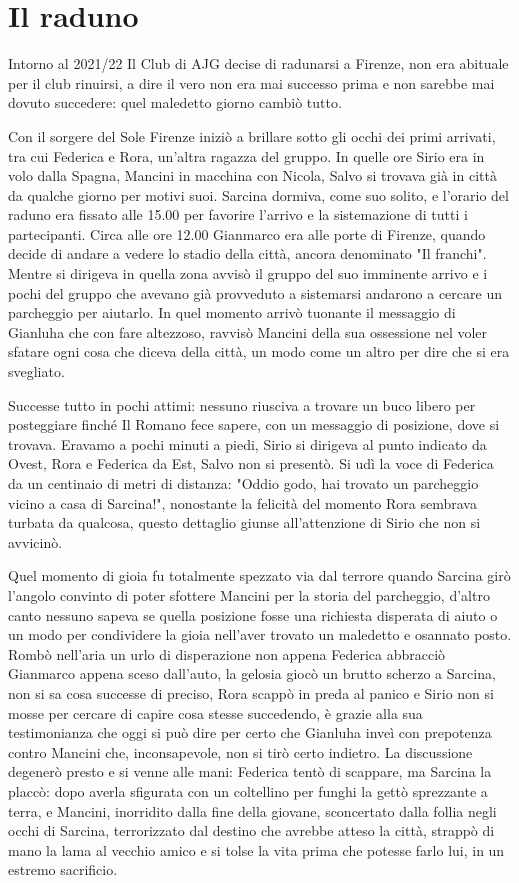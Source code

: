 \section{Il raduno}
Intorno al 2021/22 Il Club di AJG decise di radunarsi a Firenze, non era abituale per il club rinuirsi, a dire il vero non era mai successo prima e non sarebbe mai dovuto succedere: quel maledetto giorno cambiò tutto.

Con il sorgere del Sole Firenze iniziò a brillare sotto gli occhi dei primi arrivati, tra cui Federica e Rora, un'altra ragazza del gruppo. In quelle ore Sirio era in volo dalla Spagna, Mancini in macchina con Nicola, Salvo si trovava già in città da qualche giorno per motivi suoi.
Sarcina dormiva, come suo solito, e l'orario del raduno era fissato alle 15.00 per favorire l'arrivo e la sistemazione di tutti i partecipanti.
Circa alle ore 12.00 Gianmarco era alle porte di Firenze, quando decide di andare a vedere lo stadio della città, ancora denominato "Il franchi". Mentre si dirigeva in quella zona avvisò il gruppo del suo imminente arrivo e i pochi del gruppo che avevano già provveduto a sistemarsi andarono a cercare un parcheggio per aiutarlo. In quel momento arrivò tuonante il messaggio di Gianluha che con fare altezzoso, ravvisò Mancini della sua ossessione nel voler sfatare ogni cosa che diceva della città, un modo come un altro per dire che si era svegliato.

Successe tutto in pochi attimi: nessuno riusciva a trovare un buco libero per posteggiare finché Il Romano fece sapere, con un messaggio di posizione, dove si trovava. Eravamo a pochi minuti a piedi, Sirio si dirigeva al punto indicato da Ovest, Rora e Federica da Est, Salvo non si presentò. Si udì la voce di Federica da un centinaio di metri di distanza: "Oddio godo, hai trovato un parcheggio vicino a casa di Sarcina!", nonostante la felicità del momento Rora sembrava turbata da qualcosa, questo dettaglio giunse all'attenzione di Sirio che non si avvicinò. 

Quel momento di gioia fu totalmente spezzato via dal terrore quando Sarcina girò l'angolo convinto di poter sfottere Mancini per la storia del parcheggio, d'altro canto nessuno sapeva se quella posizione fosse una richiesta disperata di aiuto o un modo per condividere la gioia nell'aver trovato un maledetto e osannato posto. Rombò nell'aria un urlo di disperazione non appena Federica abbracciò Gianmarco appena sceso dall'auto, la gelosia giocò un brutto scherzo a Sarcina, non si sa cosa successe di preciso, Rora scappò in preda al panico e Sirio non si mosse per cercare di capire cosa stesse succedendo, è grazie alla sua testimonianza che oggi si può dire per certo che Gianluha inveì con prepotenza contro Mancini che, inconsapevole, non si tirò certo indietro. La discussione degenerò presto e si venne alle mani: Federica tentò di scappare, ma Sarcina la placcò: dopo averla sfigurata con un coltellino per funghi la gettò sprezzante a terra, e Mancini, inorridito dalla fine della giovane, sconcertato dalla follia negli occhi di Sarcina, terrorizzato dal destino che avrebbe atteso la città, strappò di mano la lama al vecchio amico e si tolse la vita prima che potesse farlo lui, in un estremo sacrificio.

